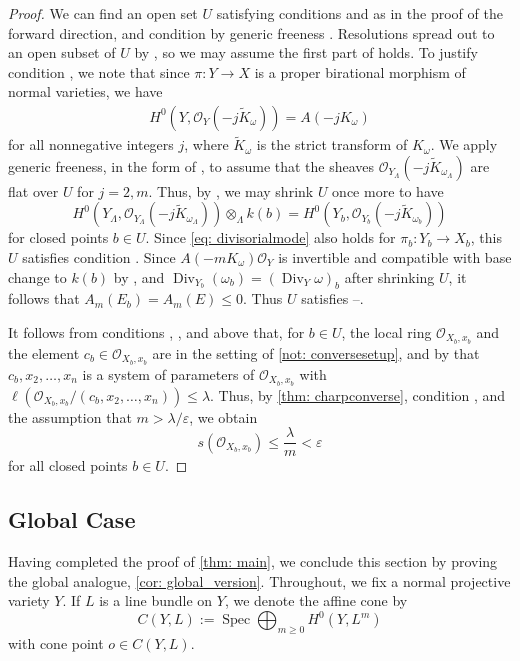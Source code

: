 \documentclass[11pt,leqno]{amsart}
\numberwithin{equation}{section}
\theoremstyle{definition}
\theoremstyle{remark}
\renewcommand{\O}{\mathcal{O}}
\newcommand{\Spec}{\operatorname{Spec}}
\newcommand{\Div}{\operatorname{Div}}
\begin{document}
\begin{proof}
We can find an open set $U$ satisfying conditions  and  as in the proof of the forward direction, and condition  by generic freeness \cite[Chapter 6, Theorem 1.8]{SSbook}. Resolutions spread out to an open subset of $U$ by \cite[Chapter 6, Theorem 3.2]{SSbook}, so we may assume the first part of  holds. To justify condition , we note that since $\pi: Y \to X$ is a proper birational morphism of normal varieties, we have \begin{align} \label{eq: divisorialmode} H^0(Y, \O_Y(-j\widetilde{K}_{\omega})) = A(-jK_{\omega}) \end{align} for all nonnegative integers $j$, where $\widetilde{K}_{\omega}$ is the strict transform of $K_{\omega}$. We apply generic freeness, in the form of \cite[Chapter 6, Theorem 1.8]{SSbook}, to assume that the sheaves $\O_{Y_\Lambda}(-j\widetilde{K}_{\omega_{\Lambda}})$ are flat over $U$ for $j = 2, m$. Thus, by \cite[Chapter 6, Lemma 1.14]{SSbook}, we may shrink $U$ once more to have $$H^0(Y_{\Lambda}, \O_{Y_\Lambda}(-j\widetilde{K}_{\omega_{\Lambda}})) \otimes_\Lambda k(b) = H^0(Y_b,  \O_{Y_b}(-j\widetilde{K}_{\omega_{b}}))$$ for closed points $b \in U$. Since \cref{eq: divisorialmode} also holds for $\pi_b: Y_b \to X_b$, this $U$ satisfies condition . Since $A(-mK_\omega)\O_Y$ is invertible and compatible with base change to $k(b)$ by , and $\Div_{Y_b}(\omega_b) = (\Div_Y \omega)_b$ after shrinking $U$, it follows that $A_m(E_b) = A_m(E) \leq 0$. Thus $U$ satisfies --.  


It follows from conditions , , and  above that, for $b \in U$, the local ring $\O_{X_b, x_b}$ and the element $c_b \in \O_{X_b, x_b}$ are in the setting of \cref{not: conversesetup}, and by  that $c_b, x_2, \dots, x_n$ is a system of parameters of $\O_{X_b, x_b}$ with $\ell(\O_{X_b, x_b}/(c_b, x_2, \dots, x_n)) \leq \lambda$. Thus, by \cref{thm: charpconverse}, condition , and the assumption that $m > \lambda/\varepsilon$, we obtain $$s(\O_{X_b, x_b}) \leq \frac{\lambda}{m} < \varepsilon$$ for all closed points $b \in U$. 
\end{proof}

\subsection*{Global Case} Having completed the proof of \cref{thm: main}, we conclude this section by proving the global analogue, \cref{cor: global_version}. Throughout, we fix a normal projective variety $Y$. If $L$ is a line bundle on $Y$, we denote the affine cone by $$C(Y, L) := \Spec \bigoplus_{m \geq 0} H^0(Y, L^m)$$ with cone point $o \in C(Y, L)$. 
\end{document}
